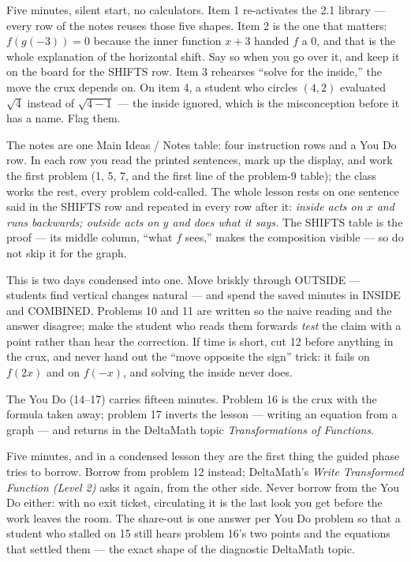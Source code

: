 \documentclass[10pt]{article}
\begin{document}
\begin{teachernote}[Warm-Up]
Five minutes, silent start, no calculators. Item 1 re-activates the 2.1 library --- every
row of the notes reuses those five shapes. Item 2 is the one that matters: $f(g(-3)) = 0$
because the inner function $x + 3$ handed $f$ a 0, and that is the whole explanation of the
horizontal shift. Say so when you go over it, and keep it on the board for the SHIFTS row.
Item 3 rehearses ``solve for the inside,'' the move the crux depends on. On item 4, a student
who circles $(4, 2)$ evaluated $\sqrt{4}$ instead of $\sqrt{4 - 1}$ --- the inside ignored,
which is the misconception before it has a name. Flag them.
\end{teachernote}

\begin{teachernote}
The notes are one Main Ideas / Notes table: four instruction rows and a You Do row. In each
row you read the printed sentences, mark up the display, and work the first problem (1, 5, 7,
and the first line of the problem-9 table); the class works the rest, every problem
cold-called. The whole lesson rests on one sentence said in the SHIFTS row and repeated in
every row after it: \emph{inside acts on $x$ and runs backwards; outside acts on $y$ and does
what it says.} The SHIFTS table is the proof --- its middle column, ``what $f$ sees,'' makes
the composition visible --- so do not skip it for the graph.

This is two days condensed into one. Move briskly through OUTSIDE --- students find vertical
changes natural --- and spend the saved minutes in INSIDE and COMBINED. Problems 10 and 11 are
written so the naive reading and the answer disagree; make the student who reads them forwards
\emph{test} the claim with a point rather than hear the correction. If time is short, cut 12
before anything in the crux, and never hand out the ``move opposite the sign'' trick: it fails
on $f(2x)$ and on $f(-x)$, and solving the inside never does.

The You Do (14--17) carries fifteen minutes. Problem 16 is the crux with the formula taken
away; problem 17 inverts the lesson --- writing an equation from a graph --- and returns in the
DeltaMath topic \textit{Transformations of Functions}.
\end{teachernote}

\begin{teachernote}[Debrief]
Five minutes, and in a condensed lesson they are the first thing the guided phase tries to
borrow. Borrow from problem 12 instead; DeltaMath's \textit{Write Transformed Function
(Level 2)} asks it again, from the other side.
Never borrow from the You Do either: with no exit ticket, circulating it is the last look you get before the work leaves the room. The share-out is one answer per You
Do problem so that a student who stalled on 15 still hears problem 16's two points and the
equations that settled them --- the exact shape of the diagnostic DeltaMath topic.
\end{teachernote}
\end{document}
